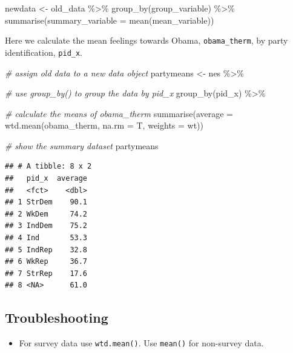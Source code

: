 \documentclass[
]{book}
\newenvironment{Shaded}{\begin{snugshade}}{\end{snugshade}}
\newcommand{\AttributeTok}[1]{\textcolor[rgb]{0.77,0.63,0.00}{#1}}
\newcommand{\CommentTok}[1]{\textcolor[rgb]{0.56,0.35,0.01}{\textit{#1}}}
\newcommand{\FunctionTok}[1]{\textcolor[rgb]{0.00,0.00,0.00}{#1}}
\newcommand{\NormalTok}[1]{#1}
\newcommand{\OtherTok}[1]{\textcolor[rgb]{0.56,0.35,0.01}{#1}}
\newcommand{\SpecialCharTok}[1]{\textcolor[rgb]{0.00,0.00,0.00}{#1}}
\providecommand{\tightlist}{%
  \setlength{\itemsep}{0pt}\setlength{\parskip}{0pt}}
\begin{document}
\begin{Shaded}
\begin{Highlighting}[]
\NormalTok{newdata }\OtherTok{\textless{}{-}}\NormalTok{ old\_data }\SpecialCharTok{\%\textgreater{}\%}
  \FunctionTok{group\_by}\NormalTok{(group\_variable) }\SpecialCharTok{\%\textgreater{}\%}
  \FunctionTok{summarise}\NormalTok{(}\AttributeTok{summary\_variable =} \FunctionTok{mean}\NormalTok{(mean\_variable))}
\end{Highlighting}
\end{Shaded}

Here we calculate the mean feelings towards Obama, \texttt{obama\_therm}, by party identification, \texttt{pid\_x}.

\begin{Shaded}
\begin{Highlighting}[]
\CommentTok{\# assign old data to a new data object}
\NormalTok{partymeans }\OtherTok{\textless{}{-}}\NormalTok{ nes }\SpecialCharTok{\%\textgreater{}\%}
  
  \CommentTok{\# use group\_by() to group the data by pid\_x}
  \FunctionTok{group\_by}\NormalTok{(pid\_x) }\SpecialCharTok{\%\textgreater{}\%}
  
  \CommentTok{\# calculate the means of obama\_therm}
  \FunctionTok{summarise}\NormalTok{(}\AttributeTok{average =} \FunctionTok{wtd.mean}\NormalTok{(obama\_therm, }\AttributeTok{na.rm =}\NormalTok{ T,}
                               \AttributeTok{weights =}\NormalTok{ wt))}

\CommentTok{\# show the summary dataset}
\NormalTok{partymeans}
\end{Highlighting}
\end{Shaded}

\begin{verbatim}
## # A tibble: 8 x 2
##   pid_x  average
##   <fct>    <dbl>
## 1 StrDem    90.1
## 2 WkDem     74.2
## 3 IndDem    75.2
## 4 Ind       53.3
## 5 IndRep    32.8
## 6 WkRep     36.7
## 7 StrRep    17.6
## 8 <NA>      61.0
\end{verbatim}

\hypertarget{troubleshooting-15}{%
\subsection{Troubleshooting}\label{troubleshooting-15}}

\begin{itemize}
\tightlist
\item
  For survey data use \texttt{wtd.mean()}. Use \texttt{mean()} for non-survey data.
\end{itemize}
\end{document}
